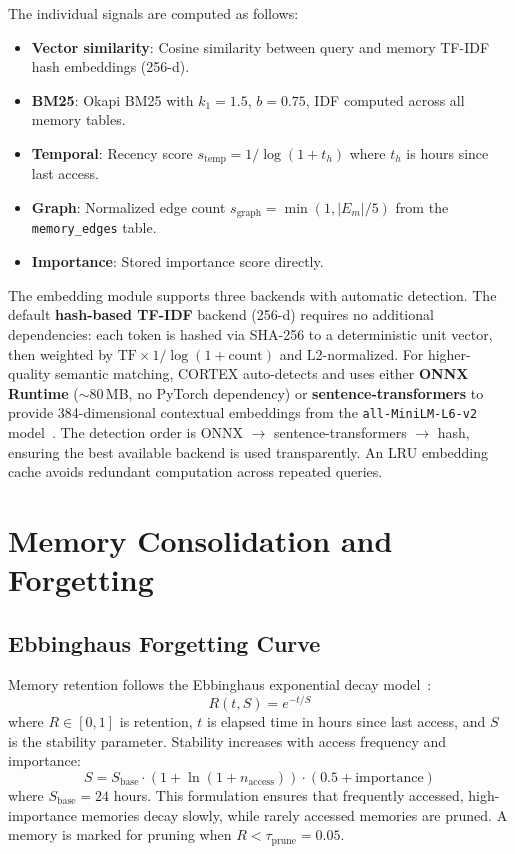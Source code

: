 \documentclass[runningheads]{llncs}
\begin{document}
The individual signals are computed as follows:
\begin{itemize}[leftmargin=*]
    \item \textbf{Vector similarity}: Cosine similarity between query and memory TF-IDF hash embeddings (256-d).
    \item \textbf{BM25}: Okapi BM25 with $k_1=1.5$, $b=0.75$, IDF computed across all memory tables.
    \item \textbf{Temporal}: Recency score $s_{\text{temp}} = 1/\log(1 + t_h)$ where $t_h$ is hours since last access.
    \item \textbf{Graph}: Normalized edge count $s_{\text{graph}} = \min(1, |E_m| / 5)$ from the \texttt{memory\_edges} table.
    \item \textbf{Importance}: Stored importance score directly.
\end{itemize}

The embedding module supports three backends with automatic detection. The default \textbf{hash-based TF-IDF} backend (256-d) requires no additional dependencies: each token is hashed via SHA-256 to a deterministic unit vector, then weighted by $\text{TF} \times 1/\log(1+\text{count})$ and L2-normalized. For higher-quality semantic matching, CORTEX auto-detects and uses either \textbf{ONNX Runtime} ($\sim$80\,MB, no PyTorch dependency) or \textbf{sentence-transformers} to provide 384-dimensional contextual embeddings from the \texttt{all-MiniLM-L6-v2} model~\cite{reimers2019sentence}. The detection order is ONNX $\rightarrow$ sentence-transformers $\rightarrow$ hash, ensuring the best available backend is used transparently. An LRU embedding cache avoids redundant computation across repeated queries.

\section{Memory Consolidation and Forgetting}\label{sec:consolidation}

\subsection{Ebbinghaus Forgetting Curve}\label{sec:forgetting}

Memory retention follows the Ebbinghaus exponential decay model~\cite{ebbinghaus1885memory}:
\begin{equation}\label{eq:forgetting}
    R(t, S) = e^{-t/S}
\end{equation}
where $R \in [0,1]$ is retention, $t$ is elapsed time in hours since last access, and $S$ is the stability parameter. Stability increases with access frequency and importance:
\begin{equation}\label{eq:stability}
    S = S_{\text{base}} \cdot (1 + \ln(1 + n_{\text{access}})) \cdot (0.5 + \text{importance})
\end{equation}
where $S_{\text{base}} = 24$ hours. This formulation ensures that frequently accessed, high-importance memories decay slowly, while rarely accessed memories are pruned. A memory is marked for pruning when $R < \tau_{\text{prune}} = 0.05$.
\end{document}
